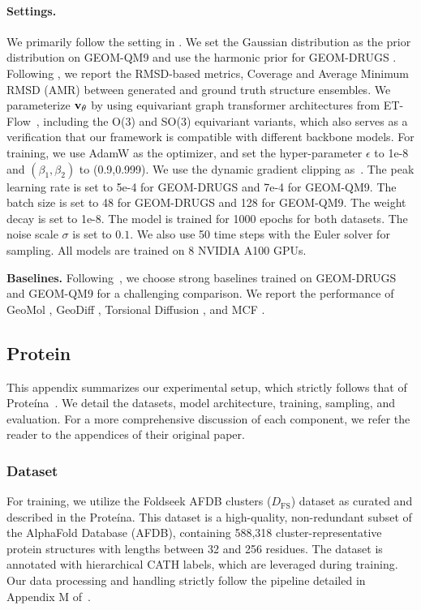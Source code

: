 \paragraph{Settings.} We primarily follow the setting in \citep{hassan2024flow}. We set the Gaussian distribution as the prior distribution on GEOM-QM9 and use the harmonic prior for GEOM-DRUGS \citep{volk2023alphaflow}. Following \citep{jing2022torsional,xu2022geodiff}, we report the RMSD-based metrics, \eg Coverage and Average Minimum RMSD (AMR) between generated and ground truth structure ensembles. We parameterize $\mathbf{v}_{\theta}$ by using equivariant graph transformer architectures from ET-Flow~\citep{hassan2024flow}, including the O(3) and SO(3) equivariant variants, which also serves as a verification that our framework is compatible with different backbone models. For training,  we use AdamW as the optimizer, and set the hyper-parameter $\epsilon$ to 1e-8 and $(\beta_1,\beta_2)$ to (0.9,0.999). We use the dynamic gradient clipping as~\citep{hassan2024flow,hoogeboom22equivariant}. The peak learning rate is set to 5e-4 for GEOM-DRUGS and 7e-4 for GEOM-QM9. The batch size is set to 48 for GEOM-DRUGS and 128 for GEOM-QM9.  The weight decay is set to 1e-8. The model is trained for 1000 epochs for both datasets. The noise scale $\sigma$ is set to $0.1$. We also use 50 time steps with the Euler solver for sampling. All models are trained on 8 NVIDIA A100 GPUs.

\textbf{Baselines.} Following~\citep{hassan2024flow}, we choose strong baselines trained on GEOM-DRUGS and GEOM-QM9 for a challenging comparison. We report the performance of GeoMol \citep{ganea2021geomol}, GeoDiff \citep{xu2022geodiff}, Torsional Diffusion \citep{jing2022torsional}, and MCF \citep{wang2023swallowing}. 

\subsection{Protein}\label{appx:protein}

This appendix summarizes our experimental setup, which strictly follows that of Prote\'ina~\citep{geffner2025proteina}.
We detail the datasets, model architecture, training, sampling, and evaluation. 
For a more comprehensive discussion of each component, we refer the reader to the appendices of their original paper.

\subsubsection{Dataset}
\label{appx:protein_dataset}
For training, we utilize the Foldseek AFDB clusters ($D_{\text{FS}}$) dataset as curated and described in the Prote\'ina. 
This dataset is a high-quality, non-redundant subset of the AlphaFold Database (AFDB), containing 588,318 cluster-representative protein structures with lengths between 32 and 256 residues. 
The dataset is annotated with hierarchical CATH labels, which are leveraged during training. 
Our data processing and handling strictly follow the pipeline detailed in Appendix M of~\citep{geffner2025proteina}.


